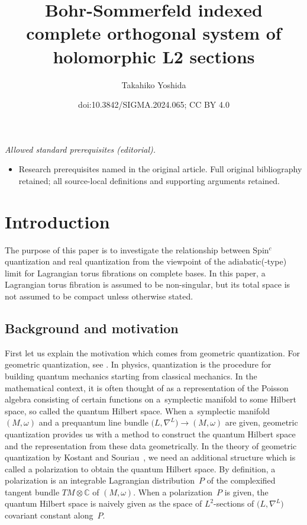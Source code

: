 \documentclass[10pt,a4paper]{amsart}
\title{Bohr-Sommerfeld indexed complete orthogonal system of holomorphic L2 sections}
\author{Takahiko Yoshida}
\date{doi:10.3842/SIGMA.2024.065; CC BY 4.0}
\numberwithin{equation}{section}
\newcommand{\C}{\mathbb{C}}
\begin{document}
\maketitle
\noindent\textit{Allowed standard prerequisites (editorial).}\begin{itemize}
\item Research prerequisites named in the original article. Full original bibliography retained; all source-local definitions and supporting arguments retained.
\end{itemize}\medskip
\section{Introduction}
The purpose of this paper is to investigate the relationship between Spin${}^c$ quantization and real quantization from the viewpoint of the adiabatic(-type) limit for Lagrangian torus fibrations on complete bases. In this paper, a Lagrangian torus fibration is assumed to be non-singular, but its total space is not assumed to be compact unless otherwise stated.

\subsection{Background and motivation}
First let us explain the motivation which comes from geometric quantization. For geometric quantization, see \cite{Hall, Ki2,Sn,Woodhouse}. In physics, quantization is the procedure for building quantum mechanics starting from classical mechanics. In the mathematical context, it is often thought of as a representation of the Poisson algebra consisting of certain functions on a~symplectic manifold to some Hilbert space, so called the quantum Hilbert space. When a~symplectic manifold~$(M,\omega)$ and a prequantum line bundle $\bigl(L,\nabla^L\bigr)\to (M,\omega)$ are given, geometric quantization provides us with a method to construct the quantum Hilbert space and the representation from these data
geometrically. In the theory of geometric quantization by Kostant and Souriau~\cite{Kos1,Sou2, Sou1}, we need an additional structure which is called a polarization to obtain the quantum Hilbert space. By definition, a polarization is an integrable Lagrangian distribution~$P$ of the complexified tangent bundle $TM\otimes \C$ of $(M,\omega)$. When a polarization~$P$ is given, the quantum Hilbert space is naively given as the space of $L^2$-sections of $\bigl(L,\nabla^L\bigr)$ covariant constant along~$P$.
\end{document}

